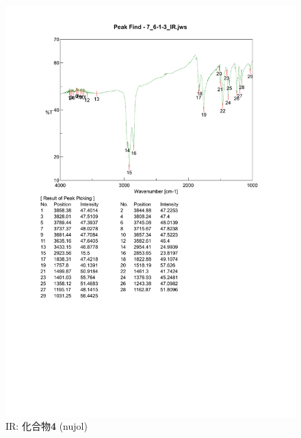 \documentclass{ltjsarticle}
\theoremstyle{definition}
\numberwithin{equation}{section}
\begin{document}
\begin{figure}[htbp]
\begin{center}
\includegraphics[width = 15 cm]{IR_6-1-3.pdf}
\caption{IR: 化合物\textbf{4} (nujol)}
\label{IR_6-1-3}
\end{center}
\end{figure}
\end{document}
